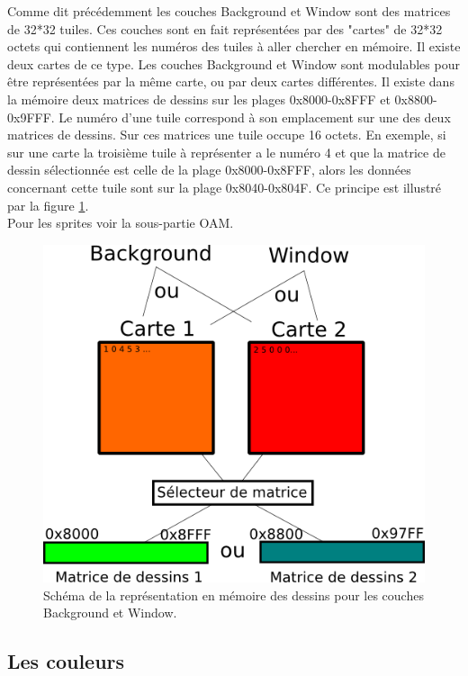 \documentclass{report}
\begin{document}
Comme dit précédemment les couches Background et Window sont des matrices de 32*32 tuiles. Ces couches sont en fait représentées par des "cartes" de 32*32 octets qui contiennent les numéros des tuiles à aller chercher en mémoire. Il existe deux cartes de ce type. Les couches Background et Window sont modulables pour être représentées par la même carte, ou par deux cartes différentes. Il existe dans la mémoire deux matrices de dessins sur les plages 0x8000-0x8FFF et 0x8800-0x9FFF. Le numéro d'une tuile correspond à son emplacement sur une des deux matrices de dessins. Sur ces matrices une tuile occupe 16 octets. En exemple, si sur une carte la troisième tuile à représenter a le numéro 4 et que la matrice de dessin sélectionnée est celle de la plage 0x8000-0x8FFF, alors les données concernant cette tuile sont sur la plage 0x8040-0x804F. Ce principe est illustré par la figure \ref{gpu_dessins}.\\Pour les sprites voir la sous-partie OAM.

\begin{figure}[!h]
\centering
\includegraphics[scale=0.8]{images/schema_matrice_dessin.png}
\caption{Schéma de la représentation en mémoire des dessins pour les couches Background et Window.}
\label{gpu_dessins}
\end{figure}

\subsection{Les couleurs}
\end{document}
